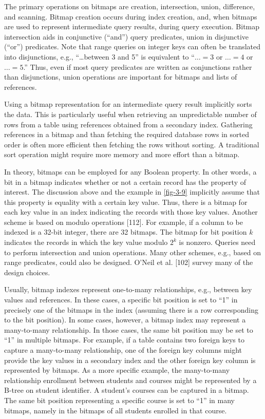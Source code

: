 The primary operations on bitmaps are creation, intersection, union,
difference, and scanning. Bitmap creation occurs during index creation,
and, when bitmaps are used to represent intermediate query results,
during query execution. Bitmap intersection aids in conjunctive
(``and'') query predicates, union in disjunctive (``or'') predicates.
Note that range queries on integer keys can often be translated into
disjunctions, e.g., ``\ldots between 3 and 5'' is equivalent to
``$\ldots = 3$ or $\ldots = 4$ or $\ldots = 5$.'' Thus, even if
most query predicates are written as conjunctions rather than
disjunctions, union operations are important for bitmaps and lists of
references.

Using a bitmap representation for an intermediate query result
implicitly sorts the data. This is particularly useful when retrieving
an unpredictable number of rows from a table using references obtained
from a secondary index. Gathering references in a bitmap and than
fetching the required database rows in sorted order is often more
efficient then fetching the rows without sorting. A traditional sort
operation might require more memory and more effort than a bitmap.

In theory, bitmaps can be employed for any Boolean property. In other
words, a bit in a bitmap indicates whether or not a certain record has
the property of interest. The discussion above and the example in \autoref{fig-3-9}
implicitly assume that this property is equality with a certain key
value. Thus, there is a bitmap for each key value in an index indicating
the records with those key values. Another scheme is based on modulo
operations {[}112{]}. For example, if a column to be indexed is a 32-bit
integer, there are 32 bitmaps. The bitmap for bit position $k$
indicates the records in which the key value modulo
$2^k$ is nonzero. Queries need to perform
intersection and union operations. Many other schemes, e.g., based on
range predicates, could also be designed. O'Neil et al. {[}102{]} survey
many of the design choices.

Usually, bitmap indexes represent one-to-many relationships, e.g.,
between key values and references. In these cases, a specific bit
position is set to ``1'' in precisely one of the bitmaps in the index
(assuming there is a row corresponding to the bit position). In some
cases, however, a bitmap index may represent a many-to-many
relationship. In those cases, the same bit position may be set to ``1''
in multiple bitmaps. For example, if a table contains two foreign keys
to capture a many-to-many relationship, one of the foreign key columns
might provide the key values in a secondary index and the other foreign
key column is represented by bitmaps. As a more specific example, the
many-to-many relationship enrollment between students and courses might
be represented by a B-tree on student identifier. A student's courses
can be captured in a bitmap. The same bit position representing a
specific course is set to ``1'' in many bitmaps, namely in the bitmaps
of all students enrolled in that course.

